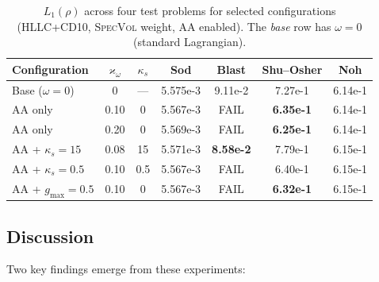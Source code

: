 \documentclass[twocolumn]{aastex63}
\begin{document}
\begin{table}[t!]
\caption{$L_1(\rho)$ across four test problems for selected
  configurations (HLLC+CD10, \textsc{SpecVol} weight, AA enabled).
  The \textit{base} row has $\omega=0$ (standard Lagrangian).}
\label{tab:multiproblem}
\centering
\begin{tabular}{lcccccc}
\toprule
Configuration & $\varkappa_\omega$ & $\kappa_s$ & Sod & Blast & Shu--Osher & Noh \\
\midrule
Base ($\omega\!=\!0$)    & 0    & ---  & 5.575e-3 & 9.11e-2  & 7.27e-1 & 6.14e-1 \\
AA only                  & 0.10 & 0    & 5.567e-3 & FAIL     & \textbf{6.35e-1} & 6.14e-1 \\
AA only                  & 0.20 & 0    & 5.569e-3 & FAIL     & \textbf{6.25e-1} & 6.14e-1 \\
AA + $\kappa_s\!=\!15$   & 0.08 & 15   & 5.571e-3 & \textbf{8.58e-2} & 7.79e-1 & 6.15e-1 \\
AA + $\kappa_s\!=\!0.5$  & 0.10 & 0.5  & 5.567e-3 & FAIL     & 6.40e-1 & 6.15e-1 \\
AA + $g_{\max}\!=\!0.5$  & 0.10 & 0    & 5.567e-3 & FAIL     & \textbf{6.32e-1} & 6.15e-1 \\
\bottomrule
\end{tabular}
\end{table}

\subsection{Discussion}

Two key findings emerge from these experiments:
\end{document}
